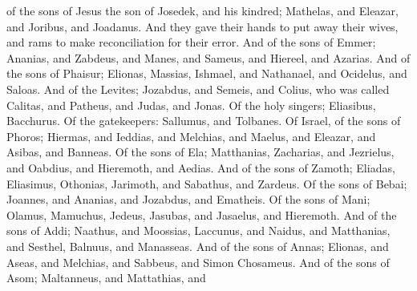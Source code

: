 {of the sons of Jesus the son of Josedek, and his kindred;
 Mathelas, and Eleazar, and
 Joribus, and
 Joadanus.
And they gave their hands to put away their wives, and
{} rams to make reconciliation for their error.
And of the sons of Emmer; Ananias, and Zabdeus, and
 Manes, and
 Sameus, and
 Hiereel, and
 Azarias.
And of the sons of
 Phaisur; Elionas, Massias, Ishmael, and Nathanael, and
 Ocidelus, and
 Saloas.
And of the Levites; Jozabdus, and Semeis, and
 Colius, who was called
 Calitas, and
 Patheus, and Judas, and Jonas.
Of the holy singers;
 Eliasibus, Bacchurus.
Of the gatekeepers: Sallumus, and
 Tolbanes.
Of Israel, of the sons of
 Phoros;
 Hiermas, and
 Ieddias, and Melchias, and
 Maelus, and Eleazar, and
 Asibas, and Banneas.
Of the sons of Ela; Matthanias, Zacharias, and
 Jezrielus, and Oabdius, and Hieremoth, and
 Aedias.
And of the sons of
 Zamoth;
 Eliadas,
 Eliasimus,
 Othonias, Jarimoth, and
 Sabathus, and
 Zardeus.
Of the sons of Bebai; Joannes, and Ananias, and
 Jozabdus, and
 Ematheis.
Of the sons of
 Mani;
 Olamus,
 Mamuchus,
 Jedeus, Jasubas, and
 Jasaelus, and Hieremoth.
And of the sons of Addi; Naathus, and Moossias, Laccunus, and Naidus, and Matthanias, and Sesthel, Balnuus, and Manasseas.
And of the sons of Annas; Elionas, and Aseas, and Melchias, and Sabbeus, and Simon Chosameus.
And of the sons of Asom;
 Maltanneus, and
 Mattathias, and
}
